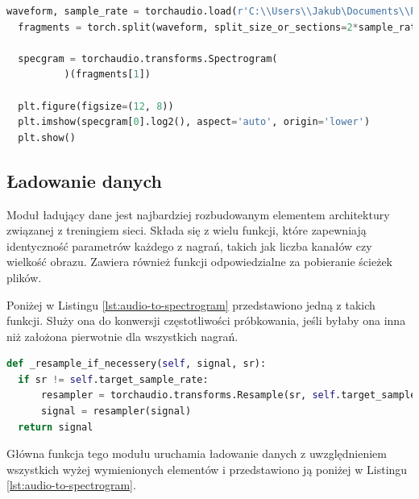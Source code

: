 \documentclass{sprz}
\begin{document}
\begin{lstlisting}[language=Python,caption={Implementacja konwersji dźwięku na spektrogram}, label={lst:audio-to-spektrogram}]
  waveform, sample_rate = torchaudio.load(r'C:\\Users\\Jakub\Documents\\PJATK\\INZ\Batmonit_model\\Chiro_sounds_signed\Audio\\PIPNAT\S4U08639_20210731_234142_PIPNAT.wav')
  fragments = torch.split(waveform, split_size_or_sections=2*sample_rate, dim=1)
  
  specgram = torchaudio.transforms.Spectrogram(
          )(fragments[1])
  
  plt.figure(figsize=(12, 8))
  plt.imshow(specgram[0].log2(), aspect='auto', origin='lower')
  plt.show()
\end{lstlisting}


\subsection{Ładowanie danych}

Moduł ładujący dane jest najbardziej rozbudowanym elementem architektury związanej z treningiem sieci. Składa się z wielu funkcji, które zapewniają identyczność parametrów każdego z nagrań, takich jak liczba kanałów czy wielkość obrazu. Zawiera również funkcji odpowiedzialne za pobieranie ścieżek plików.

Poniżej w Listingu \ref{lst:audio-to-spectrogram} przedstawiono jedną z takich funkcji. Służy ona do konwersji częstotliwości próbkowania, jeśli byłaby ona inna niż założona pierwotnie dla wszystkich nagrań.

\begin{lstlisting}[language=Python,caption={Implementacja konwersji dźwięku na spektrogram}, label={lst:audio-to-spectrogram}]
  def _resample_if_necessery(self, signal, sr):
  if sr != self.target_sample_rate:
      resampler = torchaudio.transforms.Resample(sr, self.target_sample_rate)
      signal = resampler(signal)
  return signal
\end{lstlisting}

Główna funkcja tego modułu uruchamia ładowanie danych z uwzględnieniem wszystkich wyżej wymienionych elementów i przedstawiono ją poniżej w Listingu \ref{lst:audio-to-spectrogram}.
\end{document}
